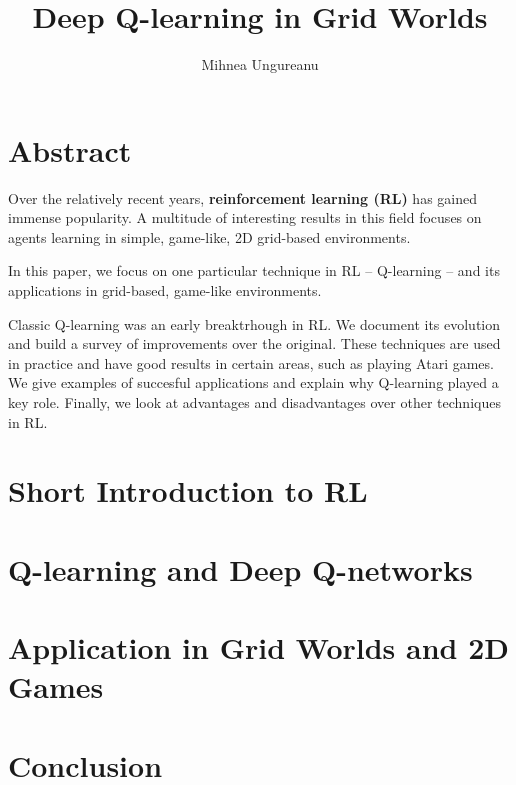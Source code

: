 \documentclass[12pt]{report}
\title{
    {Deep Q-learning in Grid Worlds}
}
\author{Mihnea Ungureanu}
\begin{document}
\maketitle

\chapter*{Abstract}
Over the relatively recent years, \textbf{reinforcement learning (RL)} has gained immense popularity.
A multitude of interesting results in this field focuses on agents learning in simple, game-like, 2D grid-based environments.

In this paper, we focus on one particular technique in RL -- Q-learning -- and its applications in grid-based, game-like environments.

Classic Q-learning was an early breaktrhough in RL.
We document its evolution and build a survey of improvements over the original.
These techniques are used in practice and have good results in certain areas, such as playing Atari games.
We give examples of succesful applications and explain why Q-learning played a key role.
Finally, we look at advantages and disadvantages over other techniques in RL.

\tableofcontents

\chapter{Short Introduction to RL}


\chapter{Q-learning and Deep Q-networks}


\chapter{Application in Grid Worlds and 2D Games}


\chapter{Conclusion}



\end{document}
